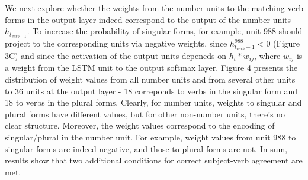 We next explore whether the weights from the number units to the matching verb forms in the output layer indeed correspond to the output of the number units $h_{t_{verb-1}}$. To increase the probability of singular forms, for example, unit 988 should project to the corresponding units via negative weights, since $h^{988}_{t_{verb}-1}<0$ (Figure 3C) and since the activation of the output units depeneds on $h_t*w_{ij}$, where $w_{ij}$ is a weight from the LSTM unit to the output softmax layer. Figure 4 presents the distribution of weight values from all number units and from several other units to 36 units at the output layer - 18 correponds to verbs in the singular form and 18 to verbs in the plural forms. Clearly, for number units, weights to singular and plural forms have different values, but for other non-number units, there's no clear structure. Moreover, the weight values correspond to the encoding of singular/plural in the number unit. For example, weight values from unit 988 to singular forms are indeed negative, and those to plural forms are not. In sum, results show that two additional conditions for correct subject-verb agreement are met.






